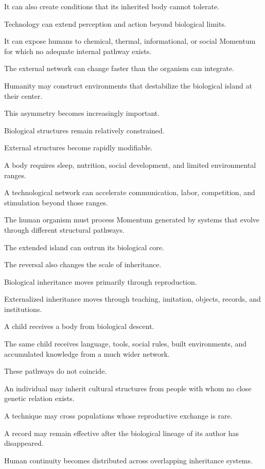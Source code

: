 It can also create conditions that its inherited body cannot tolerate.

Technology can extend perception and action beyond biological limits.

It can expose humans to chemical, thermal, informational, or social Momentum for which no adequate internal pathway exists.

The external network can change faster than the organism can integrate.

Humanity may construct environments that destabilize the biological island at their center.

This asymmetry becomes increasingly important.

Biological structures remain relatively constrained.

External structures become rapidly modifiable.

A body requires sleep, nutrition, social development, and limited environmental ranges.

A technological network can accelerate communication, labor, competition, and stimulation beyond those ranges.

The human organism must process Momentum generated by systems that evolve through different structural pathways.

The extended island can outrun its biological core.

The reversal also changes the scale of inheritance.

Biological inheritance moves primarily through reproduction.

Externalized inheritance moves through teaching, imitation, objects, records, and institutions.

A child receives a body from biological descent.

The same child receives language, tools, social rules, built environments, and accumulated knowledge from a much wider network.

These pathways do not coincide.

An individual may inherit cultural structures from people with whom no close genetic relation exists.

A technique may cross populations whose reproductive exchange is rare.

A record may remain effective after the biological lineage of its author has disappeared.

Human continuity becomes distributed across overlapping inheritance systems.

